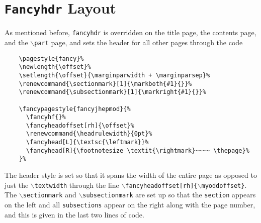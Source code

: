 \documentclass[10pt]{article}
\begin{document}
	\section{\texttt{Fancyhdr} Layout}
	As mentioned before, \texttt{fancyhdr} is overridden on the title page, the contents page, and the \texttt{$\backslash$part} page, and sets the header for all other pages through the code
	\begin{verbatim}
	\pagestyle{fancy}%
	\newlength{\offset}%
	\setlength{\offset}{\marginparwidth + \marginparsep}%
	\renewcommand{\sectionmark}[1]{\markboth{#1}{}}%
	\renewcommand{\subsectionmark}[1]{\markright{#1}{}}%

	\fancypagestyle{fancyjhepmod}{%
	  \fancyhf{}%
	  \fancyheadoffset[rh]{\offset}%
	  \renewcommand{\headrulewidth}{0pt}%
	  \fancyhead[L]{\textsc{\leftmark}}%
	  \fancyhead[R]{\footnotesize \textit{\rightmark}~~~~ \thepage}%
	}%
	\end{verbatim}
	The header style is set so that it spans the width of the entire page as opposed to just the \texttt{$\backslash$textwidth} through the line \texttt{$\backslash$fancyheadoffset[rh]\{$\backslash$myoddoffset\}}. The \texttt{$\backslash$sectionmark} and \texttt{$\backslash$subsectionmark} are set up so that the \texttt{section} appears on the left and all \texttt{subsections} appear on the right along with the page number, and this is given in the last two lines of code.
\end{document}
